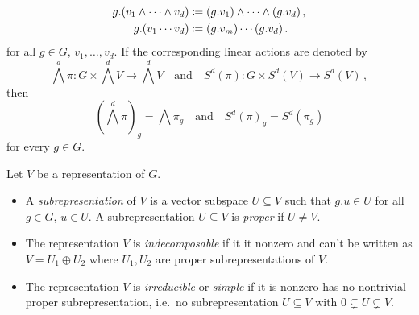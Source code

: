 \begin{example}
\begin{enumerate}
      \begin{align*}
                  g.(v_1 \wedge \dotsb \wedge v_d)
        &\coloneqq (g.v_1) \wedge \dotsb \wedge (g.v_d) \,,
        \\
                  g.(v_1 \dotsm v_d)
        &\coloneqq (g.v_m) \dotsm (g.v_d) \,.
      \end{align*}
      for all $g \in G$, $v_1, \dotsc, v_d$.
      If the corresponding linear actions are denoted by
      \[
        \bigwedge^d \pi \colon G \times \bigwedge^d V \to \bigwedge^d V
        \quad\text{and}\quad
        S^d(\pi) \colon G \times S^d(V) \to S^d(V) \,,
      \]
      then
      \[
          \left( \bigwedge^d \pi \right)_g
        = \bigwedge \pi_g
        \quad\text{and}\quad
          S^d(\pi)_g
        = S^d(\pi_g)
      \]
      for every $g \in G$.
  \end{enumerate}
\end{example}


\begin{definition}
    Let $V$ be a representation of $G$.
    \begin{itemize}
      \item
        A \emph{subrepresentation} of $V$ is a vector subspace $U \subseteq V$ such that $g.u \in U$ for all $g \in G$, $u \in U$.
        A subrepresentation $U \subseteq V$ is \emph{proper} if $U \neq V$.
      \item
        The representation $V$ is \emph{indecomposable} if it it nonzero and can’t be written as $V = U_1 \oplus U_2$ where $U_1, U_2$ are proper subrepresentations of $V$.
      \item
        The representation $V$ is \emph{irreducible} or \emph{simple} if it is nonzero has no nontrivial proper subrepresentation, i.e.\ no subrepresentation $U \subseteq V$ with $0 \subsetneq U \subsetneq V$.
    \end{itemize}
\end{definition}


